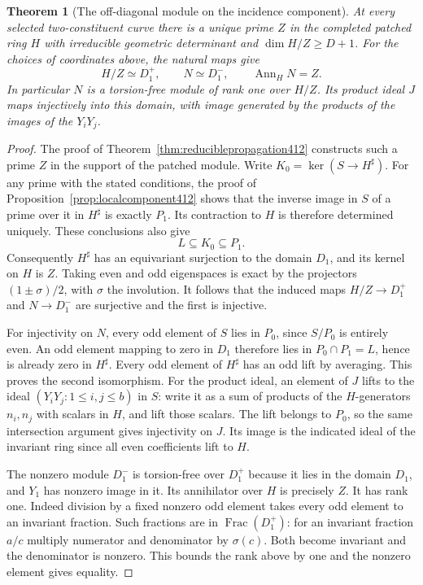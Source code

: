 \documentclass[a4paper,11pt]{article}
\newtheorem{theorem}[proposition]{Theorem}
\theoremstyle{definition}
\theoremstyle{remark}
\numberwithin{equation}{section}
\begin{document}
\begin{theorem}[The off-diagonal module on the incidence component]\leavevmode
\label{thm:incidenceannihilator413}
At every selected two-constituent curve there is a unique
prime \(Z\) in the completed patched ring \(H\) with
irreducible geometric determinant and \(\dim H/Z\ge D+1\).
For the choices of coordinates above, the natural maps give
\[
     H/Z\simeq D_1^+,\qquad N\simeq D_1^-,\qquad
     \operatorname{Ann}_H N=Z .
\]
In particular \(N\) is a torsion-free module of rank one
over \(H/Z\). Its product ideal \(J\) maps injectively into
this domain, with image generated by the products of the
images of the \(Y_iY_j\).
\end{theorem}
\begin{proof}
The proof of Theorem~\ref{thm:reduciblepropagation412}
constructs such a prime \(Z\) in the support of the patched
module. Write \(K_0=\ker(S\to H^\sharp)\). For any prime
with the stated conditions, the proof of
Proposition~\ref{prop:localcomponent412} shows that the
inverse image in \(S\) of a prime over it in \(H^\sharp\)
is exactly \(P_1\). Its contraction to \(H\) is therefore
determined uniquely. These conclusions also give
\[
                       L\subseteq K_0\subseteq P_1 .
\]
Consequently \(H^\sharp\) has an equivariant surjection to
the domain \(D_1\), and its kernel on \(H\) is \(Z\).
Taking even and odd eigenspaces is exact by the projectors
\((1\pm\sigma)/2\), with \(\sigma\) the involution. It
follows that the induced maps \(H/Z\to D_1^+\) and
\(N\to D_1^-\) are surjective and the first is injective.

For injectivity on \(N\), every odd element of \(S\)
lies in \(P_0\), since \(S/P_0\) is entirely even.
An odd element mapping to zero in \(D_1\) therefore lies
in \(P_0\cap P_1=L\), hence is already zero in \(H^\sharp\).
Every odd element of \(H^\sharp\) has an odd lift by
averaging. This proves the second isomorphism. For the
product ideal, an element of \(J\) lifts to the ideal
\((Y_iY_j:1\le i,j\le b)\) in \(S\): write it as a sum of
products of the \(H\)-generators \(n_i,n_j\) with scalars
in \(H\), and lift those scalars. The lift belongs to
\(P_0\), so the same intersection argument gives injectivity
on \(J\). Its image is the indicated ideal of the invariant
ring since all even coefficients lift to \(H\).

The nonzero module \(D_1^-\) is torsion-free over
\(D_1^+\) because it lies in the domain \(D_1\), and
\(Y_1\) has nonzero image in it. Its annihilator over \(H\)
is precisely \(Z\). It has rank one. Indeed division by a
fixed nonzero odd element takes every odd element to an
invariant fraction. Such fractions are in
\(\operatorname{Frac}(D_1^+)\): for an invariant fraction
\(a/c\) multiply numerator and denominator by \(\sigma(c)\).
Both become invariant and the denominator is nonzero. This
bounds the rank above by one and the nonzero element gives
equality.
\end{proof}
\end{document}
